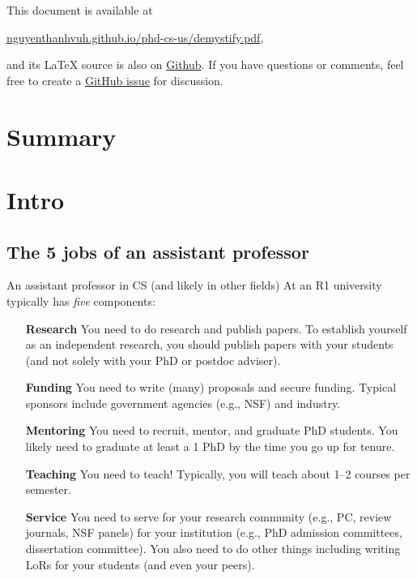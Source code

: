 \documentclass[oneside,11pt]{memoir}
\begin{document}
This document is available at 

\begin{center}
  \href{https://nguyenthanhvuh.github.io/phd-cs-us/demystify.pdf}{nguyenthanhvuh.github.io/phd-cs-us/demystify.pdf},
\end{center}

\noindent and its \LaTeX{} source is also on \href{https://github.com/nguyenthanhvuh/phd-cs-us}{Github}. If you have questions or comments, feel free to create a \href{https://github.com/nguyenthanhvuh/phd-cs-us/issues}{GitHub issue} for discussion.

\newpage
\tableofcontents*

\chapter{Summary}\label{sec:summary}
\mainmatter
\chapter{Intro}


\section{The 5 jobs of an assistant professor}
An assistant professor in CS (and likely in other fields) At an R1 university typically has \emph{five} components:

\begin{enumerate}
\item[\textbf{Research}] You need to do research and publish papers.  To establish yourself as an independent research, you should publish papers with your students (and not solely with your PhD or postdoc adviser).

\item[\textbf{Funding}] You need to write (many) proposals and secure funding. Typical sponsors include government agencies (e.g., NSF) and industry.

\item[\textbf{Mentoring}] You need to recruit, mentor, and graduate PhD students.  You likely need to graduate at least a 1 PhD by the time you go up for tenure.

\item[\textbf{Teaching}] You need to teach! Typically, you will teach about 1--2 courses per semester.

  \item[\textbf{Service}]  You need to serve for your research community (e.g., PC, review journals, NSF panels) for your institution (e.g., PhD admission committees, dissertation committee).  You also need to do other things including writing LoRs for your students (and even your peers).


\end{enumerate}
\end{document}
